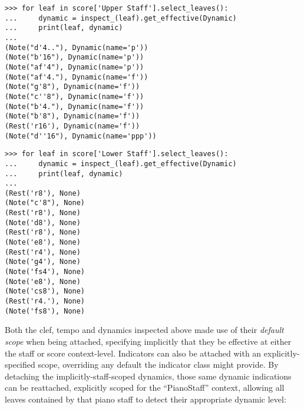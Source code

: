\begin{comment}
<abjad>
for leaf in score['Upper Staff'].select_leaves():
    dynamic = inspect_(leaf).get_effective(Dynamic)
    print(leaf, dynamic)

for leaf in score['Lower Staff'].select_leaves():
    dynamic = inspect_(leaf).get_effective(Dynamic)
    print(leaf, dynamic)

</abjad>
\end{comment}

\begin{abjadbookoutput}
\begin{singlespacing}
\vspace{-0.5\baselineskip}
\begin{verbatim}
>>> for leaf in score['Upper Staff'].select_leaves():
...     dynamic = inspect_(leaf).get_effective(Dynamic)
...     print(leaf, dynamic)
...
(Note("d'4.."), Dynamic(name='p'))
(Note("b'16"), Dynamic(name='p'))
(Note("af'4"), Dynamic(name='p'))
(Note("af'4."), Dynamic(name='f'))
(Note("g'8"), Dynamic(name='f'))
(Note("c''8"), Dynamic(name='f'))
(Note("b'4."), Dynamic(name='f'))
(Note("b'8"), Dynamic(name='f'))
(Rest('r16'), Dynamic(name='f'))
(Note("d''16"), Dynamic(name='ppp'))
\end{verbatim}
\begin{verbatim}
>>> for leaf in score['Lower Staff'].select_leaves():
...     dynamic = inspect_(leaf).get_effective(Dynamic)
...     print(leaf, dynamic)
...
(Rest('r8'), None)
(Note("c'8"), None)
(Rest('r8'), None)
(Note('d8'), None)
(Rest('r8'), None)
(Note('e8'), None)
(Rest('r4'), None)
(Note('g4'), None)
(Note('fs4'), None)
(Note('e8'), None)
(Note('cs8'), None)
(Rest('r4.'), None)
(Note('fs8'), None)
\end{verbatim}
\end{singlespacing}
\end{abjadbookoutput}

\noindent Both the clef, tempo and dynamics inspected above made use of their
\emph{default scope} when being attached, specifying implicitly that they be
effective at either the staff or score context-level. Indicators can also be
attached with an explicitly-specified scope, overriding any default the
indicator class might provide. By detaching the
implicitly-staff-scoped dynamics, those same dynamic indications can be
reattached, explicitly scoped for the \enquote{PianoStaff} context, allowing
all leaves contained by that piano staff to detect their appropriate dynamic
level:

\begin{comment}
<abjad>
piano_dynamic = detach(Dynamic, score['Voice 1'][0][0])[0]
forte_dynamic = detach(Dynamic, score['Voice 1'][1][0])[0]
attach(piano_dynamic, score['Voice 1'][0][0], scope='PianoStaff')
attach(forte_dynamic, score['Voice 1'][1][0], scope='PianoStaff')
for leaf in score['Upper Staff'].select_leaves():
    dynamic = inspect_(leaf).get_effective(Dynamic)
    print(leaf, dynamic)

for leaf in score['Lower Staff'].select_leaves():
    dynamic = inspect_(leaf).get_effective(Dynamic)
    print(leaf, dynamic)

</abjad>
\end{comment}

